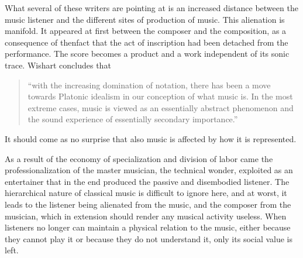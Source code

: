 \documentclass[11pt]{article}
\begin{document}
What several of these writers are pointing at is an increased distance between the music listener and the different sites of production of music. This alienation is manifold. It appeared at first between the composer and the composition, as a consequence of thenfact that the act of inscription had been detached from the performance. The score becomes a product and a work independent of its sonic trace. Wishart concludes that 

\begin{quote}
  ``with the increasing domination of notation, there has been a move
  towards Platonic idealism in our conception of what music is. In the
  most extreme cases, music is viewed as an essentially abstract
  phenomenon and the sound experience of essentially secondary
  importance.'' \citep[p.35]{wis96}
\end{quote}
It should come as no surprise that also music is affected by how it is represented. 


As a result of the economy of specialization and division of labor came the professionalization of the master musician, the technical wonder, exploited as an entertainer that in the end produced the passive and disembodied listener. The hierarchical nature of classical music is difficult to ignore here, and at worst, it leads to the listener being alienated from the music, and the composer from the musician, which in extension should render any musical activity useless. When listeners no longer can maintain a physical relation to the music, either because they cannot play it or because they do not understand it, only its social value is left. 

\end{document}

